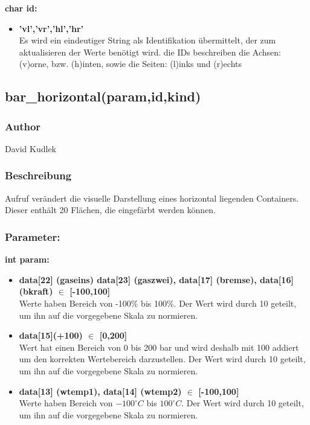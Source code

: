 \documentclass[fontsize = 12pt, paper = a4]{scrreprt}
\begin{document}
\textbf{char id:}
\begin{itemize}
\item \textbf{'vl','vr','hl','hr'}\\
Es wird ein eindeutiger String als Identifikation übermittelt, der zum aktualisieren der Werte benötigt wird. die IDs beschreiben die Achsen: (v)orne, bzw. (h)inten, sowie die Seiten: (l)inks und (r)echts\\
\end{itemize}


\subsection*{bar\_horizontal(param,id,kind)}
\subsubsection*{Author}
David Kudlek
\subsubsection*{Beschreibung}
Aufruf verändert die visuelle Darstellung eines horizontal liegenden Containers. Dieser enthält 20 Flächen, die eingefärbt werden können. 	
\subsubsection*{Parameter:}
\textbf{int param:}
\begin{itemize}

\item \textbf{ data[22] (gaseins) data[23] (gaszwei), data[17] (bremse), data[16] (bkraft) $\in$ [-100,100]} \\
Werte haben Bereich von -100\% bis 100\%. Der Wert wird durch 10 geteilt, um ihn auf die vorgegebene Skala zu normieren.


\item \textbf{ data[15](+100) $\in$ [0,200]} \\
Wert hat einen Bereich von 0 bis 200 bar und wird deshalb mit 100 addiert um den korrekten Wertebereich darzustellen. Der Wert wird durch 10 geteilt, um ihn auf die vorgegebene Skala zu normieren.

\item \textbf{ data[13] (wtemp1), data[14] (wtemp2) $\in$ [-100,100]} \\
Werte haben Bereich von $-100^\circ C $ bis $100^\circ C $. Der Wert wird durch 10 geteilt, um ihn auf die vorgegebene Skala zu normieren.\\
\end{itemize}
\end{document}
